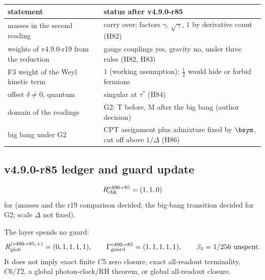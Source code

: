 \begin{center}
\small
\begin{tabular}{@{}>{\raggedright\arraybackslash}p{}>{\raggedright\arraybackslash}p{}@{}}
\toprule
statement & status after v4.9.0-r85\\
\midrule
masses in the second reading & carry over; factors \(\gamma\), \(\sqrt\gamma\), \(1\) by derivative count (H82)\\
weights of v4.9.0-r19 from the reduction & gauge couplings yes, gravity no, under three rules (H82, H83)\\
F3 weight of the Weyl kinetic term & \(1\) (working assumption); \(\tfrac12\) would hide or forbid fermions\\
offset \(\delta\neq0\), quantum & singular at \(\tau^*\) (H84)\\
domain of the readings & G2: T before, M after the big bang (author decision)\\
big bang under G2 & CPT assignment plus admixture fixed by \(\bsym\), cut off above \(1/\Delta\) (H86)\\
\bottomrule
\end{tabular}
\end{center}

\subsection*{v4.9.0-r85 ledger and guard update}
\label{subsec:v490-r85-ledger-guard}

\[
R_{\rm chk}^{v490\text{-}r85}=(1,1,0)
\]
for (masses and the r19 comparison decided; the big-bang transition decided for G2; scale \(\Delta\) not fixed).

The layer spends no guard:
\[
R_{\rm glob}^{(v490\text{-}r85,+)}=(0,1,1,1,1),
\qquad
\Gamma_{\rm guard}^{v490\text{-}r85}=(1,1,1,1,1),
\qquad
\beta_4=1/256\ \text{unspent}.
\]
It does not imply exact finite \(C5\) zero closure, exact all-readout terminality,
\(C6/T2\), a global photon-clock/RH theorem, or global all-readout closure.
